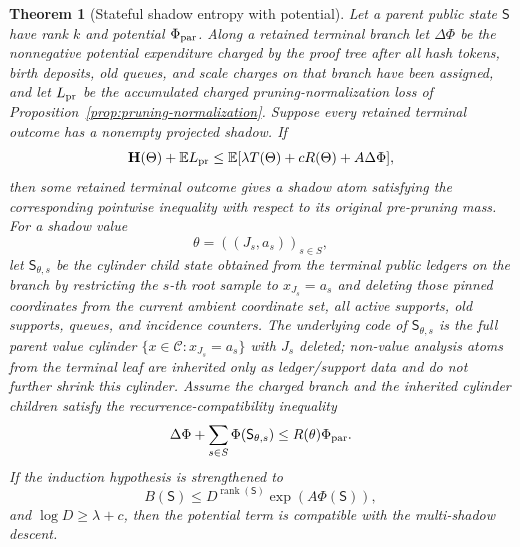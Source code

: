\documentclass[11pt]{article}
\newtheorem{theorem}{Theorem}[section]
\newcommand{\C}{\mathcal C}
\newcommand{\EE}{\mathbb E}
\newcommand{\bfH}{\mathbf H}
\newcommand{\rank}{\operatorname{rank}}
\begin{document}
\begin{theorem}[Stateful shadow entropy with potential]
\label{thm:shadow-potential}
Let a parent public state $\mathsf S$ have rank $k$ and potential
$\Phi_{\rm par}$.  Along a retained terminal branch let $\Delta\Phi$ be the
nonnegative potential expenditure charged by the proof tree after all hash
tokens, birth deposits, old queues, and scale charges on that branch have been
assigned, and let $L_{\rm pr}$ be the accumulated charged pruning-normalization
loss of Proposition~\ref{prop:pruning-normalization}.
Suppose every retained terminal outcome has a nonempty projected shadow.  If
\[
  \bfH(\Theta)+\EE L_{\rm pr}
  \le
  \EE[\lambda T(\Theta)+cR(\Theta)+A\Delta\Phi],
\]
then some retained terminal outcome gives a shadow atom satisfying the
corresponding pointwise inequality with respect to its original pre-pruning
mass.  For a
shadow value
\[
  \theta=((J_s,a_s))_{s\in S},
\]
let $\mathsf S_{\theta,s}$ be the cylinder child state obtained from the
terminal public ledgers on the branch by restricting the $s$-th root sample to
$x_{J_s}=a_s$ and deleting those pinned coordinates from the current ambient
coordinate set, all active supports, old supports, queues, and incidence
counters.  The underlying code of $\mathsf S_{\theta,s}$ is the full parent
value cylinder $\{x\in\C:x_{J_s}=a_s\}$ with $J_s$ deleted; non-value
analysis atoms from the terminal leaf are inherited only as ledger/support data
and do not further shrink this cylinder.  Assume the charged branch and the
inherited cylinder children
satisfy the recurrence-compatibility
inequality
\[
  \Delta\Phi+\sum_{s\in S}\Phi(\mathsf S_{\theta,s})
  \le R(\theta)\Phi_{\rm par}.
\]
If the induction hypothesis is strengthened to
\[
  B(\mathsf S)\le D^{\rank(\mathsf S)}\exp(A\Phi(\mathsf S)),
\]
and $\log D\ge\lambda+c$, then the potential term is compatible with the
multi-shadow descent.
\end{theorem}
\end{document}
